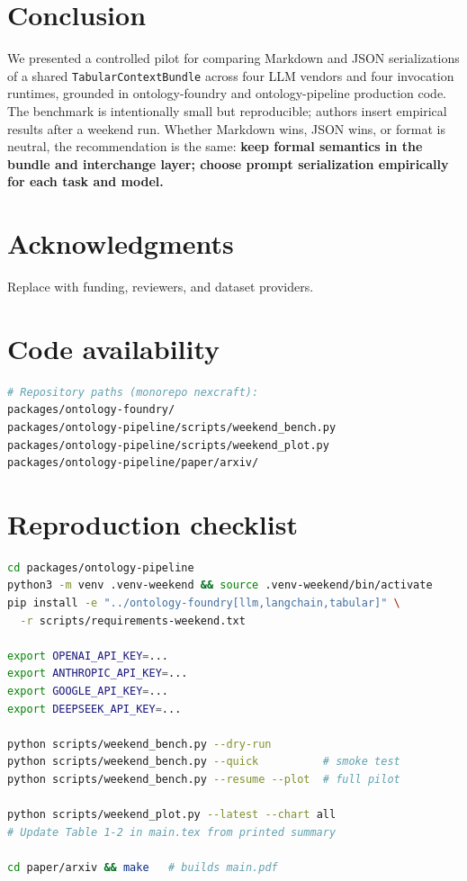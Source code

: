 \documentclass[11pt,a4paper]{article}
\begin{document}
\section{Conclusion}
We presented a controlled pilot for comparing Markdown and JSON serializations of a shared \texttt{TabularContextBundle} across four LLM vendors and four invocation runtimes, grounded in ontology-foundry and ontology-pipeline production code.
The benchmark is intentionally small but reproducible; authors insert empirical results after a weekend run.
Whether Markdown wins, JSON wins, or format is neutral, the recommendation is the same: \textbf{keep formal semantics in the bundle and interchange layer; choose prompt serialization empirically for each task and model.}

\section*{Acknowledgments}
Replace with funding, reviewers, and dataset providers.

\section*{Code availability}
\begin{lstlisting}[language=bash]
# Repository paths (monorepo nexcraft):
packages/ontology-foundry/
packages/ontology-pipeline/scripts/weekend_bench.py
packages/ontology-pipeline/scripts/weekend_plot.py
packages/ontology-pipeline/paper/arxiv/
\end{lstlisting}




\appendix
\section{Reproduction checklist}
\label{app:repro}

\begin{lstlisting}[language=bash]
cd packages/ontology-pipeline
python3 -m venv .venv-weekend && source .venv-weekend/bin/activate
pip install -e "../ontology-foundry[llm,langchain,tabular]" \
  -r scripts/requirements-weekend.txt

export OPENAI_API_KEY=...
export ANTHROPIC_API_KEY=...
export GOOGLE_API_KEY=...
export DEEPSEEK_API_KEY=...

python scripts/weekend_bench.py --dry-run
python scripts/weekend_bench.py --quick          # smoke test
python scripts/weekend_bench.py --resume --plot  # full pilot

python scripts/weekend_plot.py --latest --chart all
# Update Table 1-2 in main.tex from printed summary

cd paper/arxiv && make   # builds main.pdf
\end{lstlisting}
\end{document}
